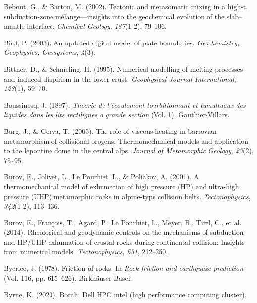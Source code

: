 \begin{CSLReferences}{1}{1}
\leavevmode{}%
Bebout, G., \& Barton, M. (2002). Tectonic and metasomatic mixing in a high-t, subduction-zone m{é}lange---insights into the geochemical evolution of the slab--mantle interface. \emph{Chemical Geology}, \emph{187}(1-2), 79--106.

\leavevmode{}%
Bird, P. (2003). An updated digital model of plate boundaries. \emph{Geochemistry, Geophysics, Geosystems}, \emph{4}(3).

\leavevmode{}%
Bittner, D., \& Schmeling, H. (1995). Numerical modelling of melting processes and induced diapirism in the lower crust. \emph{Geophysical Journal International}, \emph{123}(1), 59--70.

\leavevmode{}%
Boussinesq, J. (1897). \emph{Th{é}orie de l'{é}coulement tourbillonnant et tumultueux des liquides dans les lits rectilignes a grande section} (Vol. 1). Gauthier-Villars.

\leavevmode{}%
Burg, J., \& Gerya, T. (2005). The role of viscous heating in barrovian metamorphism of collisional orogens: Thermomechanical models and application to the lepontine dome in the central alps. \emph{Journal of Metamorphic Geology}, \emph{23}(2), 75--95.

\leavevmode{}%
Burov, E., Jolivet, L., Le Pourhiet, L., \& Poliakov, A. (2001). A thermomechanical model of exhumation of high pressure (HP) and ultra-high pressure (UHP) metamorphic rocks in alpine-type collision belts. \emph{Tectonophysics}, \emph{342}(1-2), 113--136.

\leavevmode{}%
Burov, E., François, T., Agard, P., Le Pourhiet, L., Meyer, B., Tirel, C., et al. (2014). Rheological and geodynamic controls on the mechanisms of subduction and HP/UHP exhumation of crustal rocks during continental collision: Insights from numerical models. \emph{Tectonophysics}, \emph{631}, 212--250.

\leavevmode{}%
Byerlee, J. (1978). Friction of rocks. In \emph{Rock friction and earthquake prediction} (Vol. 116, pp. 615--626). Birkh{ä}user Basel.

\leavevmode{}%
Byrne, K. (2020). Borah: Dell HPC intel (high performance computing cluster).


\end{CSLReferences}
